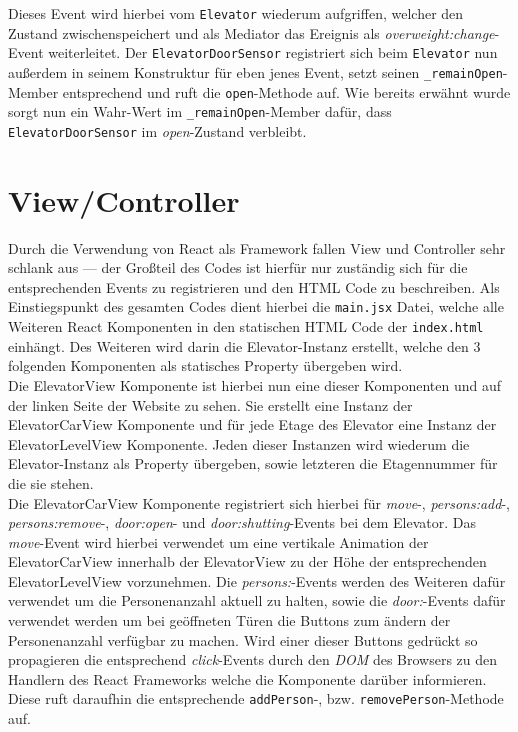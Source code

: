 Dieses Event wird hierbei vom \texttt{Elevator} wiederum aufgriffen, welcher den Zustand zwischenspeichert und als Mediator das Ereignis als \textit{overweight:change}-Event weiterleitet.
Der \texttt{ElevatorDoorSensor} registriert sich beim \texttt{Elevator} nun außerdem in seinem Konstruktur für eben jenes Event, setzt seinen \texttt{\_remainOpen}-Member entsprechend und ruft die \texttt{open}-Methode auf.
Wie bereits erwähnt wurde sorgt nun ein Wahr-Wert im \texttt{\_remainOpen}-Member dafür, dass \texttt{ElevatorDoorSensor} im \textit{open}-Zustand verbleibt.

\section{View/Controller}
\label{imp_vc}
Durch die Verwendung von React als Framework fallen View und Controller sehr schlank aus --- der Großteil des Codes ist hierfür nur zuständig sich für die entsprechenden Events zu registrieren und den HTML Code zu beschreiben.
Als Einstiegspunkt des gesamten Codes dient hierbei die \texttt{main.jsx} Datei, welche alle Weiteren React Komponenten in den statischen HTML Code der \texttt{index.html} einhängt.
Des Weiteren wird darin die Elevator-Instanz erstellt, welche den 3 folgenden Komponenten als statisches Property übergeben wird. \\

Die ElevatorView Komponente ist hierbei nun eine dieser Komponenten und auf der linken Seite der Website zu sehen.
Sie erstellt eine Instanz der ElevatorCarView Komponente und für jede Etage des Elevator eine Instanz der ElevatorLevelView Komponente.
Jeden dieser Instanzen wird wiederum die Elevator-Instanz als Property übergeben, sowie letzteren die Etagennummer für die sie stehen. \\

Die ElevatorCarView Komponente registriert sich hierbei für \textit{move}-, \textit{persons:add}-, \textit{persons:remove}-, \textit{door:open}- und \textit{door:shutting}-Events bei dem Elevator.
Das \textit{move}-Event wird hierbei verwendet um eine vertikale Animation der ElevatorCarView innerhalb der ElevatorView zu der Höhe der entsprechenden ElevatorLevelView vorzunehmen.
Die \textit{persons:}-Events werden des Weiteren dafür verwendet um die Personenanzahl aktuell zu halten, sowie die \textit{door:}-Events dafür verwendet werden um bei geöffneten Türen die Buttons zum ändern der Personenanzahl verfügbar zu machen.
Wird einer dieser Buttons gedrückt so propagieren die entsprechend \textit{click}-Events durch den \textit{DOM} des Browsers zu den Handlern des React Frameworks welche die Komponente darüber informieren.
Diese ruft daraufhin die entsprechende \texttt{addPerson}-, bzw. \texttt{removePerson}-Methode auf. \\

